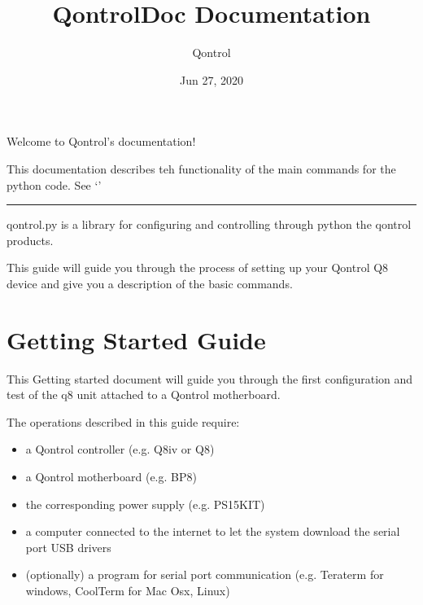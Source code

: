 \documentclass[letterpaper,10pt,english]{sphinxmanual}
\title{QontrolDoc Documentation}
\date{Jun 27, 2020}
\author{Qontrol}
\begin{document}
\pagestyle{empty}
\sphinxmaketitle
\pagestyle{plain}
\sphinxtableofcontents
\pagestyle{normal}
\label{\detokenize{index::doc}}
Welcome to Qontrol’s documentation!

This documentation describes teh functionality of the main commands for the python  code.
See ‘’


\bigskip\hrule\bigskip




qontrol.py is a library for configuring and controlling through python the qontrol products.

This guide will guide you through the process of setting up your Qontrol Q8 device and give you a description of the basic commands.


\chapter{Getting Started Guide}
\label{\detokenize{guide/getting_started:getting-started-guide}}\label{\detokenize{guide/getting_started::doc}}
This Getting started document will guide you through the first configuration and test of the q8 unit
attached to a Qontrol motherboard.

The operations described in this guide require:
\begin{itemize}
\item {} 
a Qontrol controller (e.g. Q8iv or Q8)

\item {} 
a Qontrol motherboard (e.g. BP8)

\item {} 
the corresponding power supply (e.g. PS15KIT)

\item {} 
a computer connected to the internet to let the system download the serial port USB drivers

\item {} 
(optionally) a program for serial port communication (e.g. Teraterm for windows, CoolTerm for Mac Osx, Linux)

\end{itemize}
\end{document}
